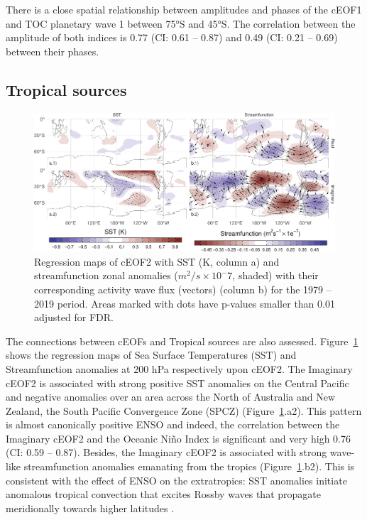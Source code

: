 \documentclass[smallextended]{svjour3}       %
\begin{document}
There is a close spatial relationship between amplitudes and phases of the cEOF1 and TOC planetary wave 1 between 75°S and 45°S.
The correlation between the amplitude of both indices is 0.77 (CI: 0.61 -- 0.87) and 0.49 (CI: 0.21 -- 0.69) between their phases.

\hypertarget{tropical}{%
\subsection{Tropical sources}\label{tropical}}



\begin{figure}
\includegraphics{../figures/sst-psi-2-1} \caption{Regression maps of cEOF2 with SST (K, column a) and streamfunction zonal anomalies (\(m^2/s\times10^-7\), shaded) with their corresponding activity wave flux (vectors) (column b) for the 1979 -- 2019 period. Areas marked with dots have p-values smaller than 0.01 adjusted for FDR.}\label{fig:sst-psi-2}
\end{figure}

The connections between cEOFs and Tropical sources are also assessed.
Figure~\ref{fig:sst-psi-2} shows the regression maps of Sea Surface Temperatures (SST) and Streamfunction anomalies at 200 hPa respectively upon cEOF2. The Imaginary cEOF2 is associated with strong positive SST anomalies on the Central Pacific and negative anomalies over an area across the North of Australia and New Zealand, the South Pacific Convergence Zone (SPCZ) (Figure~\ref{fig:sst-psi-2}.a2). This pattern is almost canonically positive ENSO \citep{bamston1997} and indeed, the correlation between the Imaginary cEOF2 and the Oceanic Niño Index \citep{bamston1997} is significant and very high 0.76 (CI: 0.59 -- 0.87).
Besides, the Imaginary cEOF2 is associated with strong wave-like streamfunction anomalies emanating from the tropics (Figure~\ref{fig:sst-psi-2}.b2). This is consistent with the effect of ENSO on the extratropics: SST anomalies initiate anomalous tropical convection that excites Rossby waves that propagate meridionally towards higher latitudes \citep{mo2000}.
\end{document}
